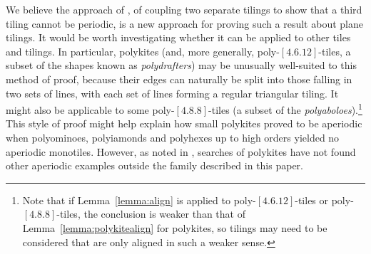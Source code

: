 We believe the approach of , of coupling two
separate tilings to show that a third tiling cannot be periodic, is a
new approach for proving such a result about plane tilings.  It would
be worth investigating whether it can be applied to other tiles and
tilings.  In particular, polykites (and, more generally,
poly-$[4.6.12]$-tiles, a subset of the shapes known as
\emph{polydrafters}) may be unusually well-suited to this method of
proof, because their edges can naturally be split into those falling
in two sets of lines, with each set of lines forming a regular
triangular tiling. It might also be applicable to some
poly-$[4.8.8]$-tiles (a subset of the
\emph{polyaboloes}).\footnote{Note that if Lemma~\ref{lemma:align} is
applied to poly-$[4.6.12]$-tiles or poly-$[4.8.8]$-tiles, the
conclusion is weaker than that of Lemma~\ref{lemma:polykitealign} for
polykites, so tilings may need to be considered that are only aligned
in such a weaker sense.}  This style of proof might help explain how
small polykites
proved to be aperiodic when polyominoes, polyiamonds and polyhexes up
to high orders yielded no aperiodic monotiles.  However, as noted in
, searches of polykites have not found other
aperiodic examples outside the family described in this paper.
